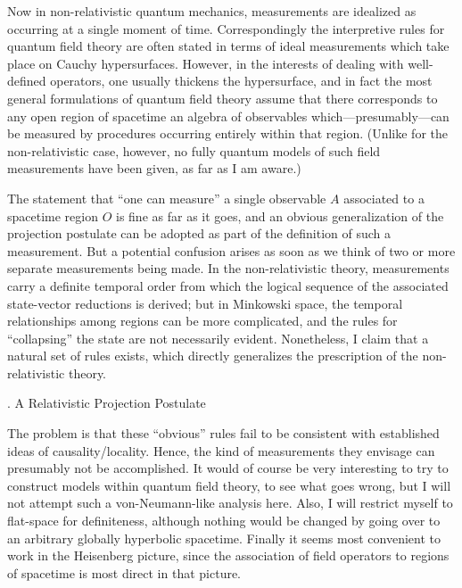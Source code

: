 \tx
Now in non-relativistic quantum mechanics, measurements are idealized
as occurring at a single moment of time.  Correspondingly the
interpretive rules for quantum field theory are often stated in terms
of ideal measurements which take place on Cauchy hypersurfaces.
However, in the interests of dealing with well-defined operators, one
usually thickens the hypersurface, and in fact the most general
formulations of quantum field theory assume that there corresponds to
any open region of spacetime an algebra of observables
which---presumably---can be measured by procedures occurring entirely
within that region.  (Unlike for the non-relativistic case, however,
no fully quantum models of such field measurements have been given, as
far as I am aware.)



\tx
The statement that ``one can measure'' a single observable $A$
associated to a spacetime region $O$ is fine as far as it goes, and an
obvious generalization of the projection postulate can be adopted as
part of the definition of such a measurement.  But a potential
confusion arises as soon as we think of two or more separate
measurements being made.  In the non-relativistic theory, measurements
carry a definite temporal order from which the logical sequence of the
associated state-vector reductions is derived; but in Minkowski space,
the temporal relationships among regions can be more complicated, and
the rules for ``collapsing'' the state
are not necessarily evident.  Nonetheless, I claim that a natural set
of rules exists, which directly generalizes the prescription of the
non-relativistic theory.


. A Relativistic Projection Postulate\par

\tx
The problem is that these ``obvious'' rules fail to be consistent
with established ideas of causality/locality.  Hence, the kind of
measurements they envisage can presumably not be accomplished.  It
would of course be very interesting to try to construct models within
quantum field theory, to see what goes wrong, but I will not attempt
such a von-Neumann-like analysis here.  Also, I will restrict myself
to flat-space for definiteness, although nothing would be changed by
going over to an arbitrary globally hyperbolic spacetime.  Finally it
seems most convenient to work in the Heisenberg picture, since the
association of field operators to regions of spacetime is most direct
in that picture.

